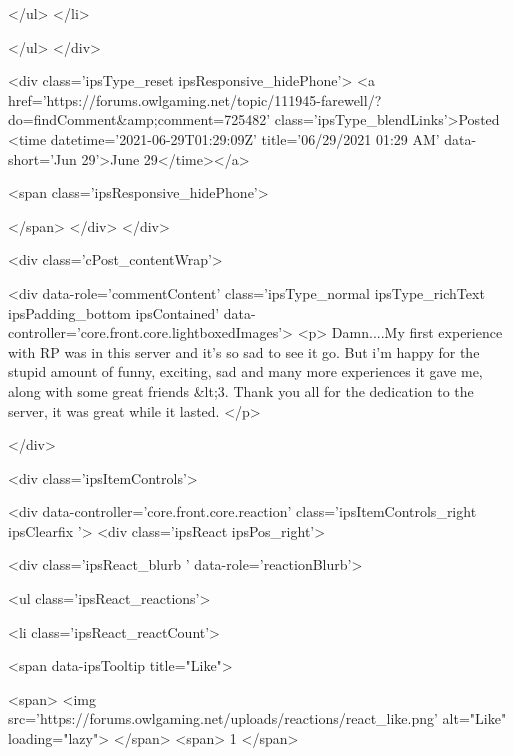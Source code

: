                         
						
						
						
							
								
							
							
							
							
							
							
						
					</ul>
				</li>
				
			</ul>
		</div>

		<div class='ipsType_reset ipsResponsive_hidePhone'>
			<a href='https://forums.owlgaming.net/topic/111945-farewell/?do=findComment&amp;comment=725482' class='ipsType_blendLinks'>Posted <time datetime='2021-06-29T01:29:09Z' title='06/29/2021 01:29  AM' data-short='Jun 29'>June 29</time></a> 
			
			<span class='ipsResponsive_hidePhone'>
				
				
			</span>
		</div>
	</div>

	

    

	<div class='cPost_contentWrap'>
		
		<div data-role='commentContent' class='ipsType_normal ipsType_richText ipsPadding_bottom ipsContained' data-controller='core.front.core.lightboxedImages'>
			<p>
	Damn....My first experience with RP was in this server and it's so sad to see it go. But i'm happy for the stupid amount of funny, exciting, sad and many more experiences it gave me, along with some great friends &lt;3. Thank you all for the dedication to the server, it was great while it lasted.
</p>


			
		</div>

		
			<div class='ipsItemControls'>
				
					
						

	<div data-controller='core.front.core.reaction' class='ipsItemControls_right ipsClearfix '>	
		<div class='ipsReact ipsPos_right'>
			
				
				<div class='ipsReact_blurb ' data-role='reactionBlurb'>
					
						

	
	<ul class='ipsReact_reactions'>
		
		
			
				
				<li class='ipsReact_reactCount'>
					
						<span data-ipsTooltip title="Like">
					
							<span>
								<img src='https://forums.owlgaming.net/uploads/reactions/react_like.png' alt="Like" loading="lazy">
							</span>
							<span>
								1
							</span>
					
